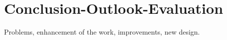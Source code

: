 \chapter{Conclusion-Outlook-Evaluation}
Problems, enhancement of the work, improvements, new design.